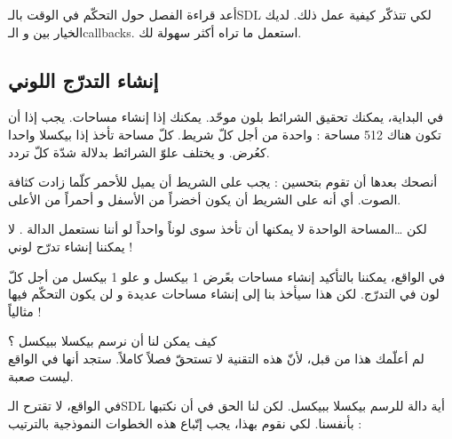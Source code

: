 أعد قراءة الفصل حول التحكّم في الوقت بالـ\textenglish{SDL}
لكي تتذكّر كيفية عمل ذلك. لديك الخيار بين
و الـ\textenglish{callbacks}.
استعمل ما تراه أكثر سهولة لك.

\subsection{إنشاء التدرّج اللوني}

في البداية، يمكنك تحقيق الشرائط بلون موحّد. يمكنك إذا إنشاء مساحات. يجب إذا أن تكون هناك 512 مساحة : واحدة من أجل كلّ شريط. كلّ مساحة تأخذ إذا بيكسلا واحدا كعُرض. و يختلف علوّ الشرائط بدلالة شدّة كلّ تردد.

أنصحك بعدها أن تقوم بتحسين : يجب على الشريط أن يميل للأحمر كلّما زادت كثافة الصوت. أي أنه على الشريط أن يكون أخضراً من الأسفل و أحمراً من الأعلى.

\begin{question}
لكن \dots المساحة الواحدة لا يمكنها أن تأخذ سوى لوناً واحداً لو أننا نستعمل الدالة
.
لا يمكننا إنشاء تدرّح لوني !
\end{question}

في الواقع، يمكننا بالتأكيد إنشاء مساحات بعًرض 1 بيكسل و علو 1 بيكسل من أجل كلّ لون في التدرّج. لكن هذا سيأخذ بنا إلى إنشاء مساحات عديدة و لن يكون التحكّم فيها مثالياً !

كيف يمكن لنا أن نرسم بيكسلا ببيكسل ؟\\
لم أعلّمك هذا من قبل، لأنّ هذه التقنية لا تستحقّ فصلاً كاملاً. ستجد أنها في الواقع ليست صعبة. 

في الواقع، لا تقترح الـ\textenglish{SDL}
أية دالة للرسم بيكسلا ببيكسل. لكن لنا الحق في أن نكتبها بأنفسنا. لكي نقوم بهذا، يجب إتّباع هذه الخطوات النموذجية بالترتيب :


